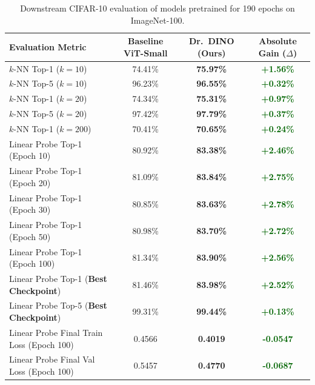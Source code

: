 \documentclass[11pt,a4paper]{article}
\begin{document}
\begin{table}[ht]
\centering
\small
\setlength{\tabcolsep}{5pt}
\caption{Downstream CIFAR-10 evaluation of models pretrained for 190 epochs on ImageNet-100.}
\label{tab:quantitative_results}
\begin{tabular}{lccc}
\toprule
\textbf{Evaluation Metric} & \textbf{Baseline ViT-Small} & \textbf{Dr.\ DINO (Ours)} & \textbf{Absolute Gain ($\Delta$)} \\
\midrule
$k$-NN Top-1 ($k=10$) & 74.41\% & \textbf{75.97\%} & \textcolor{darkgreen}{\textbf{+1.56\%}} \\
$k$-NN Top-5 ($k=10$) & 96.23\% & \textbf{96.55\%} & \textcolor{darkgreen}{\textbf{+0.32\%}} \\
$k$-NN Top-1 ($k=20$) & 74.34\% & \textbf{75.31\%} & \textcolor{darkgreen}{\textbf{+0.97\%}} \\
$k$-NN Top-5 ($k=20$) & 97.42\% & \textbf{97.79\%} & \textcolor{darkgreen}{\textbf{+0.37\%}} \\
$k$-NN Top-1 ($k=200$) & 70.41\% & \textbf{70.65\%} & \textcolor{darkgreen}{\textbf{+0.24\%}} \\
\midrule
Linear Probe Top-1 (Epoch 10) & 80.92\% & \textbf{83.38\%} & \textcolor{darkgreen}{\textbf{+2.46\%}} \\
Linear Probe Top-1 (Epoch 20) & 81.09\% & \textbf{83.84\%} & \textcolor{darkgreen}{\textbf{+2.75\%}} \\
Linear Probe Top-1 (Epoch 30) & 80.85\% & \textbf{83.63\%} & \textcolor{darkgreen}{\textbf{+2.78\%}} \\
Linear Probe Top-1 (Epoch 50) & 80.98\% & \textbf{83.70\%} & \textcolor{darkgreen}{\textbf{+2.72\%}} \\
Linear Probe Top-1 (Epoch 100) & 81.34\% & \textbf{83.90\%} & \textcolor{darkgreen}{\textbf{+2.56\%}} \\
Linear Probe Top-1 (\textbf{Best Checkpoint}) & 81.46\% & \textbf{83.98\%} & \textcolor{darkgreen}{\textbf{+2.52\%}} \\
Linear Probe Top-5 (\textbf{Best Checkpoint}) & 99.31\% & \textbf{99.44\%} & \textcolor{darkgreen}{\textbf{+0.13\%}} \\
\midrule
Linear Probe Final Train Loss (Epoch 100) & 0.4566 & \textbf{0.4019} & \textcolor{darkgreen}{\textbf{-0.0547}} \\
Linear Probe Final Val Loss (Epoch 100) & 0.5457 & \textbf{0.4770} & \textcolor{darkgreen}{\textbf{-0.0687}} \\
\bottomrule
\end{tabular}
\end{table}
\end{document}

